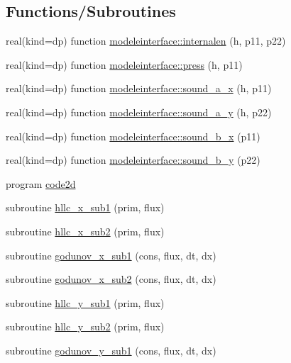 \subsection*{Functions/\+Subroutines}
\begin{DoxyCompactItemize}
\item 
real(kind=dp) function \mbox{\hyperlink{namespacemodeleinterface_a4d0b51322903b5a095f04aaafb1a8c5f}{modeleinterface\+::internalen}} (h, p11, p22)
\item 
real(kind=dp) function \mbox{\hyperlink{namespacemodeleinterface_ad34088de8c0162343994153e8f34921e}{modeleinterface\+::press}} (h, p11)
\item 
real(kind=dp) function \mbox{\hyperlink{namespacemodeleinterface_a1505c575aa44b45a8509fe827f28bc8d}{modeleinterface\+::sound\+\_\+a\+\_\+x}} (h, p11)
\item 
real(kind=dp) function \mbox{\hyperlink{namespacemodeleinterface_aea42339ec55b6d0e7333dcd4c2d6041f}{modeleinterface\+::sound\+\_\+a\+\_\+y}} (h, p22)
\item 
real(kind=dp) function \mbox{\hyperlink{namespacemodeleinterface_aa422a9d23665a7fa175a3458f15d6be2}{modeleinterface\+::sound\+\_\+b\+\_\+x}} (p11)
\item 
real(kind=dp) function \mbox{\hyperlink{namespacemodeleinterface_ae6539d207be975bdb5b8c45826062a30}{modeleinterface\+::sound\+\_\+b\+\_\+y}} (p22)
\item 
program \mbox{\hyperlink{main2Dv1_8f90_a8712173bc20143ca5b1b8cbd782b563e}{code2d}}
\item 
subroutine \mbox{\hyperlink{main2Dv1_8f90_ad651365c868e762b033239f23065b179}{hllc\+\_\+x\+\_\+sub1}} (prim, flux)
\item 
subroutine \mbox{\hyperlink{main2Dv1_8f90_a542b368221e3c5b6eed538ddc6538ca5}{hllc\+\_\+x\+\_\+sub2}} (prim, flux)
\item 
subroutine \mbox{\hyperlink{main2Dv1_8f90_aec66a1d113ade1d60ad864482ea8e4cf}{godunov\+\_\+x\+\_\+sub1}} (cons, flux, dt, dx)
\item 
subroutine \mbox{\hyperlink{main2Dv1_8f90_a95998c355563e1e58114aea99de5433b}{godunov\+\_\+x\+\_\+sub2}} (cons, flux, dt, dx)
\item 
subroutine \mbox{\hyperlink{main2Dv1_8f90_a3abf545225182ebde80c72121d2de6f2}{hllc\+\_\+y\+\_\+sub1}} (prim, flux)
\item 
subroutine \mbox{\hyperlink{main2Dv1_8f90_a66b4ae2bdd9b70fca9079c3827fa8c30}{hllc\+\_\+y\+\_\+sub2}} (prim, flux)
\item 
subroutine \mbox{\hyperlink{main2Dv1_8f90_a99b7b2764471880074ec2cb4448c3232}{godunov\+\_\+y\+\_\+sub1}} (cons, flux, dt, dx)

\end{DoxyCompactItemize}
